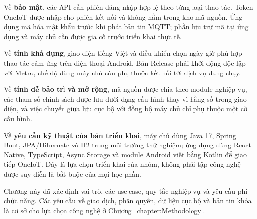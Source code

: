 \documentclass[../DoAn.tex]{subfiles}
\begin{document}
Về \textbf{bảo mật}, các API cần phiên đăng nhập hợp lệ theo từng loại thao tác. Token OneIoT được nhập cho phiên kết nối và không nằm trong kho mã nguồn. Ứng dụng mã hóa mật khẩu trước khi phát bản tin MQTT; phần lưu trữ mã tại ứng dụng và máy chủ cần được gia cố trước triển khai thực tế.

Về \textbf{tính khả dụng}, giao diện tiếng Việt và điều khiển chọn ngày giờ phù hợp thao tác cảm ứng trên điện thoại Android. Bản Release phải khởi động độc lập với Metro; chế độ dùng máy chủ còn phụ thuộc kết nối tới dịch vụ đang chạy.

Về \textbf{tính dễ bảo trì và mở rộng}, mã nguồn được chia theo module nghiệp vụ, các tham số chính sách được lưu dưới dạng cấu hình thay vì hằng số trong giao diện, và việc chuyển giữa lưu cục bộ với đồng bộ máy chủ chỉ phụ thuộc một cờ cấu hình.

Về \textbf{yêu cầu kỹ thuật của bản triển khai}, máy chủ dùng Java 17, Spring Boot, JPA/Hibernate và H2 trong môi trường thử nghiệm; ứng dụng dùng React Native, TypeScript, Async Storage và module Android viết bằng Kotlin để giao tiếp OneIoT. Đây là lựa chọn triển khai của nhóm, không phải tập công nghệ được suy diễn là bắt buộc của mọi học phần.

Chương này đã xác định vai trò, các use case, quy tắc nghiệp vụ và yêu cầu phi chức năng. Các yêu cầu về giao dịch, phân quyền, dữ liệu cục bộ và bản tin khóa là cơ sở cho lựa chọn công nghệ ở Chương~\ref{chapter:Methodology}.
\end{document}
